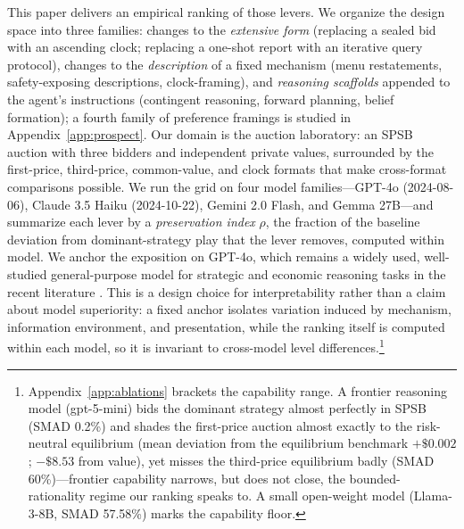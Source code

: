 This paper delivers an empirical ranking of those levers. We organize the design space into three families: changes to the \emph{extensive form} (replacing a sealed bid with an ascending clock; replacing a one-shot report with an iterative query protocol), changes to the \emph{description} of a fixed mechanism (menu restatements, safety-exposing descriptions, clock-framing), and \emph{reasoning scaffolds} appended to the agent's instructions (contingent reasoning, forward planning, belief formation); a fourth family of preference framings is studied in Appendix~\ref{app:prospect}. Our domain is the auction laboratory: an SPSB auction with three bidders and independent private values, surrounded by the first-price, third-price, common-value, and clock formats that make cross-format comparisons possible. We run the grid on four model families---GPT-4o (2024-08-06), Claude 3.5 Haiku (2024-10-22), Gemini 2.0 Flash, and Gemma 27B---and summarize each lever by a \emph{preservation index} $\rho$, the fraction of the baseline deviation from dominant-strategy play that the lever removes, computed within model. We anchor the exposition on GPT-4o, which remains a widely used, well-studied general-purpose model for strategic and economic reasoning tasks in the recent literature \citep{horton2023large, manning2024automated}. This is a design choice for interpretability rather than a claim about model superiority: a fixed anchor isolates variation induced by mechanism, information environment, and presentation, while the ranking itself is computed within each model, so it is invariant to cross-model level differences.\footnote{Appendix~\ref{app:ablations} brackets the capability range. A frontier reasoning model (gpt-5-mini) bids the dominant strategy almost perfectly in SPSB (SMAD 0.2\%) and shades the first-price auction almost exactly to the risk-neutral equilibrium (mean deviation from the equilibrium benchmark $+\$0.002$; $-\$8.53$ from value), yet misses the third-price equilibrium badly (SMAD 60\%)---frontier capability narrows, but does not close, the bounded-rationality regime our ranking speaks to. A small open-weight model (Llama-3-8B, SMAD 57.58\%) marks the capability floor.}

